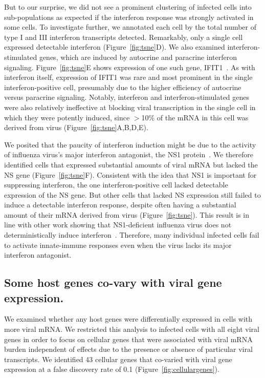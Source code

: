 \documentclass[9pt,lineno]{elife}
\begin{document}
But to our surprise, we did not see a prominent clustering of infected cells into sub-populations as expected if the interferon response was strongly activated in some cells.
To investigate further, we annotated each cell by the total number of type I and III interferon transcripts detected.
Remarkably, only a single cell expressed detectable interferon (Figure~\ref{fig:tsne}D).
We also examined interferon-stimulated genes, which are induced by autocrine and paracrine interferon signaling.
Figure~\ref{fig:tsne}E shows expression of one such gene, IFIT1~\citep{Fensterl:2011fp}.
As with interferon itself, expression of IFIT1 was rare and most prominent in the single interferon-positive cell, presumably due to the higher efficiency of autocrine versus paracrine signaling.
Notably, interferon and interferon-stimulated genes were also relatively ineffective at blocking viral transcription in the single cell in which they were potently induced, since $>$10\% of the mRNA in this cell was derived from virus (Figure~\ref{fig:tsne}A,B,D,E).

We posited that the paucity of interferon induction might be due to the activity of influenza virus's major interferon antagonist, the NS1 protein~\citep{garcia1998influenza,hale2008multifunctional}.
We therefore identified cells that expressed substantial amounts of viral mRNA but lacked the NS gene (Figure~\ref{fig:tsne}F).
Consistent with the idea that NS1 is important for suppressing interferon, the one interferon-positive cell lacked detectable expression of the NS gene.
But other cells that lacked NS expression still failed to induce a detectable interferon response, despite often having a substantial amount of their mRNA derived from virus (Figure~\ref{fig:tsne}).
This result is in line with other work showing that NS1-deficient influenza virus does not deterministically induce interferon~\citep{Killip:2017ef,Kallfass:2013kp}.
Therefore, many individual infected cells fail to activate innate-immune responses even when the virus lacks its major interferon antagonist.

\subsection{Some host genes co-vary with viral gene expression.}
We examined whether any host genes were differentially expressed in cells with more viral mRNA.
We restricted this analysis to infected cells with all eight viral genes in order to focus on cellular genes that were associated with viral mRNA burden independent of effects due to the presence or absence of particular viral transcripts.
We identified 43 cellular genes that co-varied with viral gene expression at a false discovery rate of 0.1 (Figure~\ref{fig:cellulargenes}).
\end{document}
